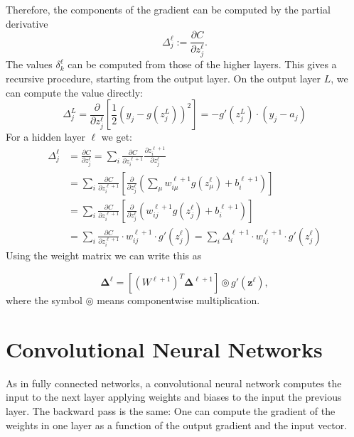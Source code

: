 \documentclass[a4paper,10pt]{article}
\newcommand{\vc}[1]{\boldsymbol{#1}}
\begin{document}
Therefore, the components of the gradient can be computed by the partial
derivative
\[
    \Delta_j^\ell := \frac{\partial C}{\partial z_j^\ell}.
\]
The values $\delta_k^\ell$ can be computed from those of the higher layers.
This gives a recursive procedure, starting from the output layer. On the output
layer $L$, we can compute the value directly:
\[
    \Delta_j^L = \frac{\partial}{\partial z_j^\ell} \left[\frac12 \left(y_j - g(z_j^L)\right)^2 \right] = -g'(z_j^L)
    \cdot (y_j - a_j)
\]
For a hidden layer $\ell$ we get:
\begin{align*}
    \Delta_j^\ell & = \frac{\partial C}{\partial z_j^\ell} = \sum_i \frac{\partial C}{\partial z_i^{\ell+1}} \frac{\partial z_i^{\ell+1}}{\partial z_j^\ell} \\  & = \sum_{i} \frac{\partial C}{\partial z_i^{\ell+1}} \left[ \frac{\partial}{\partial z_j^\ell} \left(\sum_\mu w_{i \mu}^{\ell+1} g(z_\mu^\ell) +
    b_i^{\ell+1}\right) \right]                                                                                                                              \\  & = \sum_{i} \frac{\partial C}{\partial z_i^{\ell+1}} \left[ \frac{\partial}{\partial z_j^\ell} \left(w_{i j}^{\ell+1} g(z_j^\ell) + b_i^{\ell+1} \right)
    \right]                                                                                                                                                  \\  & = \sum_{i} \frac{\partial C}{\partial z_i^{\ell+1}} \cdot w_{i j}^{\ell+1} \cdot g'(z_j^\ell) = \sum_{i}
       \Delta_i^{\ell+1} \cdot w_{i j}^{\ell+1} \cdot g'(z_j^\ell)
\end{align*}
Using the weight matrix we can write this as

\begin{equation}
    \vc\Delta^\ell = \left[ (W^{\ell +1})^T \vc\Delta^{\ell +1} \right] \circledcirc g'(\vc z^\ell),
\end{equation}
where the symbol $\circledcirc$ means componentwise multiplication.

\section{Convolutional Neural Networks}

As in fully connected networks, a convolutional neural network 
computes the input to the next layer applying weights and biases 
to the input the previous layer. The backward pass is the same: 
One can compute the gradient of the weights in one layer 
as a function of the output gradient and the input vector. 
\end{document}

